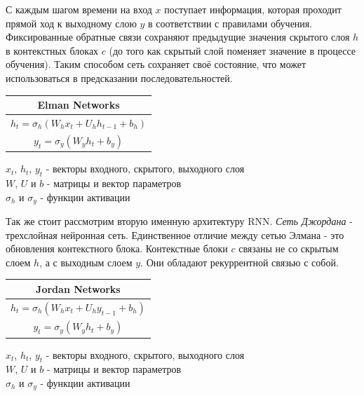 	С каждым шагом времени на вход $x$ поступает информация, которая проходит прямой ход к выходному слою $y$ в соответствии с правилами обучения. Фиксированные обратные связи сохраняют предыдущие значения скрытого слоя $h$ в контекстных блоках $c$ (до того как скрытый слой поменяет значение в процессе обучения). Таким способом сеть сохраняет своё состояние, что может использоваться в предсказании последовательностей.
	
	\begin{table}[h]
		\centering
		\begin{tabular}{|c|} 
			\hline
			\textbf{Elman Networks}  \\ 
			\hline
			$ h_{t} = \sigma_{h}(W_h x_t + U_h h_{t - 1} + b_h) $ \\ 
			$ y_{t} = \sigma_{y}(W_y h_t + b_y) $ \\
			\hline
		\end{tabular}
	\end{table}
	\begin{tabbing}
		$x_t$, $h_t$, $y_t$  - векторы входного, скрытого, выходного слоя \\
		$W$, $U$ и $b$ - матрицы и вектор параметров \\
		$\sigma_h$ и $\sigma_y$ - функции активации
	\end{tabbing}
    
    Так же стоит рассмотрим вторую именную архитектуру RNN. \textit{Сеть Джордана} - трехслойная нейронная сеть. Единственное отличие между сетью Элмана - это обновления контекстного блока. Контекстные блоки $c$ связаны не со скрытым слоем $h$, а с выходным слоем $y$. Они обладают рекуррентной связью с собой.
    
    \begin{table}[h]
		\centering
		\begin{tabular}{|c|} 
			\hline
			\textbf{Jordan Networks}  \\ 
			\hline
			$	h_{t} = \sigma_{h}(W_h x_t + U_h y_{t - 1} + b_h) $  \\
			$	y_{t} = \sigma_{y}(W_y h_t + b_y) $ \\
			\hline
		\end{tabular}
	\end{table}
	\begin{tabbing}
		$x_t$, $h_t$, $y_t$  - векторы входного, скрытого, выходного слоя \\
		$W$, $U$ и $b$ - матрицы и вектор параметров \\
		$\sigma_h$ и $\sigma_y$ - функции активации
	\end{tabbing}
	
